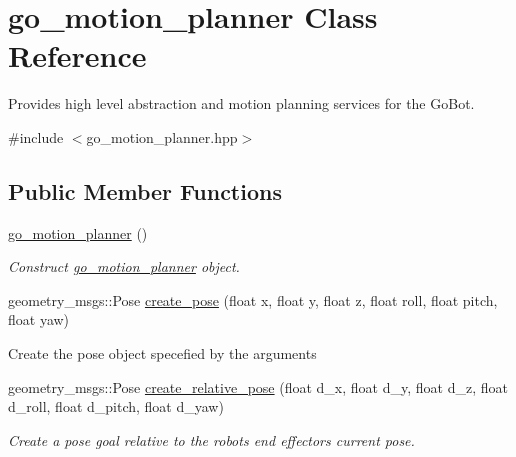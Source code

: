 \hypertarget{classgo__motion__planner}{}\section{go\+\_\+motion\+\_\+planner Class Reference}
\label{classgo__motion__planner}


Provides high level abstraction and motion planning services for the Go\+Bot.  




{\ttfamily \#include $<$go\+\_\+motion\+\_\+planner.\+hpp$>$}

\subsection*{Public Member Functions}
\begin{DoxyCompactItemize}
\item 
\mbox{\label{classgo__motion__planner_a0e38e788fa3b60e4999f8c1af3b30fa3}} 
\hyperlink{classgo__motion__planner_a0e38e788fa3b60e4999f8c1af3b30fa3}{go\+\_\+motion\+\_\+planner} ()
\begin{DoxyCompactList}\small\item\em Construct \hyperlink{classgo__motion__planner}{go\+\_\+motion\+\_\+planner} object. \end{DoxyCompactList}\item 
geometry\+\_\+msgs\+::\+Pose \hyperlink{classgo__motion__planner_a74e2e97851998d7f6b8c29f31e0adfb0}{create\+\_\+pose} (float x, float y, float z, float roll, float pitch, float yaw)
\begin{DoxyCompactList}\small\item\em 
\begin{DoxyItemize}
\item Create the pose object specefied by the arguments 
\end{DoxyItemize}\end{DoxyCompactList}\item 
geometry\+\_\+msgs\+::\+Pose \hyperlink{classgo__motion__planner_a70e5bea73ba3ec12f0d91d107c58dec1}{create\+\_\+relative\+\_\+pose} (float d\+\_\+x, float d\+\_\+y, float d\+\_\+z, float d\+\_\+roll, float d\+\_\+pitch, float d\+\_\+yaw)
\begin{DoxyCompactList}\small\item\em Create a pose goal relative to the robot\textquotesingle{}s end effector\textquotesingle{}s current pose. \end{DoxyCompactList}\item 

\end{DoxyCompactItemize}
